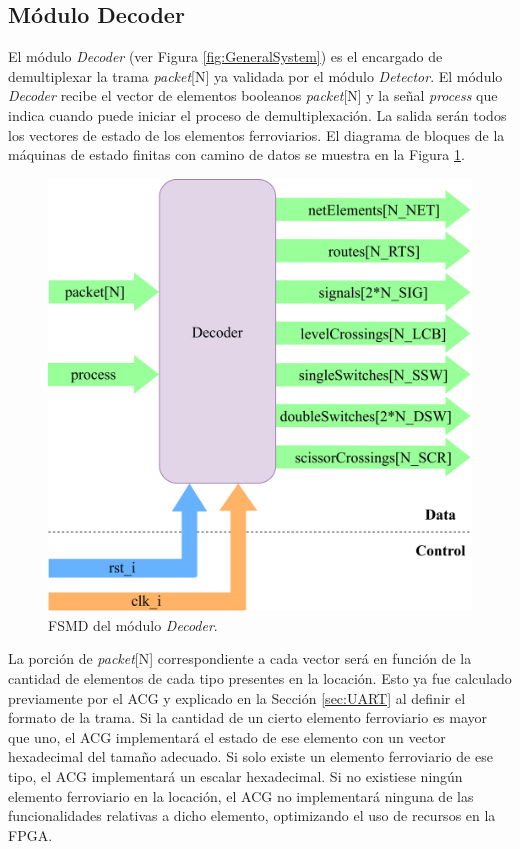 \subsection{Módulo Decoder}
	\label{sec:decoder}
	
	El módulo \textit{Decoder} (ver Figura \ref{fig:GeneralSystem}) es el encargado de demultiplexar la trama \textit{packet}[N] ya validada por el módulo \textit{Detector}. El módulo \textit{Decoder} recibe el vector de elementos booleanos \textit{packet}[N] y la señal \textit{process} que indica cuando puede iniciar el proceso de demultiplexación. La salida serán todos los vectores de estado de los elementos ferroviarios. El diagrama de bloques de la máquinas de estado finitas con camino de datos se muestra en la Figura \ref{fig:Decoder_module}.
	
	\begin{figure}[H]
		\centering
		\includegraphics[width=1\textwidth]{Figuras/Decoder_module.png}
		\centering\caption{FSMD del módulo \textit{Decoder}.}
		\label{fig:Decoder_module}
	\end{figure}
	
	 La porción de \textit{packet}[N] correspondiente a cada vector será en función de la cantidad de elementos de cada tipo presentes en la locación. Esto ya fue calculado previamente por el ACG y explicado en la Sección \ref{sec:UART} al definir el formato de la trama. Si la cantidad de un cierto elemento ferroviario es mayor que uno, el ACG implementará el estado de ese elemento con un vector hexadecimal del tamaño adecuado. Si solo existe un elemento ferroviario de ese tipo, el ACG implementará un escalar hexadecimal. Si no existiese ningún elemento ferroviario en la locación, el ACG no implementará ninguna de las funcionalidades relativas a dicho elemento, optimizando el uso de recursos en la FPGA.